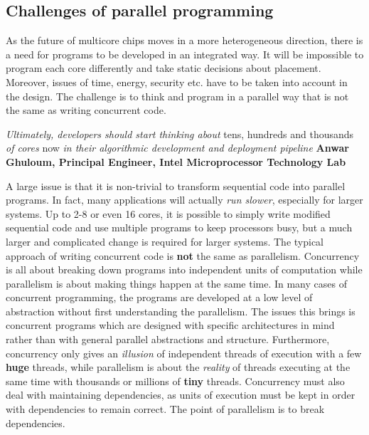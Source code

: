 \documentclass[CS4204-Notes.tex]{subfiles}
\begin{document}
\subsection{Challenges of parallel programming}
As the future of multicore chips moves in a more heterogeneous direction, there is a need for programs to be developed in an integrated way. It will be impossible to program each core differently and take static decisions about placement. Moreover, issues of time, energy, security etc. have to be taken into account in the design. The challenge is to think and program in a parallel way that is not the same as writing concurrent code. 
\begin{displayquote}
\textit{Ultimately, developers should start thinking about} tens, hundreds and thousands \textit{of cores} now \textit{in their algorithmic development and deployment pipeline}
\n
\textbf{Anwar Ghuloum, Principal Engineer, Intel Microprocessor Technology Lab}
\end{displayquote}
A large issue is that it is non-trivial to transform sequential code into parallel programs. In fact, many applications will actually \textit{run slower}, especially for larger systems. Up to 2-8 or even 16 cores, it is possible to simply write modified sequential code and use multiple programs to keep processors busy, but a much larger and complicated change is required for larger systems. 
\n
The typical approach of writing concurrent code is \textbf{not} the same as parallelism. Concurrency is all about breaking down programs into independent units of computation while parallelism is about making things happen at the same time. In many cases of concurrent programming, the programs are developed at a low level of abstraction without first understanding the parallelism. The issues this brings is concurrent programs which are designed with specific architectures in mind rather than with general parallel abstractions and structure. Furthermore, concurrency only gives an \textit{illusion} of independent threads of execution with a few \textbf{huge} threads, while parallelism is about the \textit{reality} of threads executing at the same time with thousands or millions of \textbf{tiny} threads.
\n
Concurrency must also deal with maintaining dependencies, as units of execution must be kept in order with dependencies to remain correct. The point of parallelism is to break dependencies. 
\end{document}
